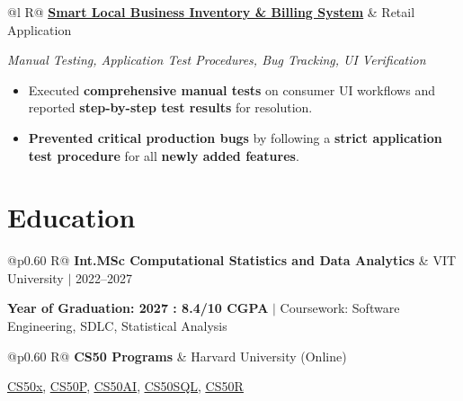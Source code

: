 \documentclass[a4paper,10pt]{article}
\newcommand{\ulink}[2]{\href{#1}{\uline{#2}}}
\newcommand{\subheading}[1]{{\color[HTML]{0A0A0A}\fontsize{12}{14}\selectfont\bfseries #1}}
\newcommand{\techstack}[1]{{\color[HTML]{5C5C5C}\fontsize{10.5}{12.5}\selectfont\itshape #1}}
\newcommand{\meta}[1]{{\color[HTML]{5C5C5C}\fontsize{10.5}{12.5}\selectfont #1}}
\begin{document}
\begin{tabularx}{\linewidth}{@{}l R@{}}
\subheading{\ulink{https://github.com/su-jin1425/Smart-Local-Business-Inventory-Billing-System}{Smart Local Business Inventory \& Billing System}} & \meta{Retail Application}
\end{tabularx}
\vspace{1pt}
\techstack{Manual Testing, Application Test Procedures, Bug Tracking, UI Verification}
\begin{itemize}[nosep, leftmargin=1.5em, itemsep=1pt, topsep=2pt]
  \item {\color[HTML]{0A0A0A}\fontsize{11}{14}\selectfont Executed \textbf{comprehensive manual tests} on consumer UI workflows and reported \textbf{step-by-step test results} for resolution.}
  \item {\color[HTML]{0A0A0A}\fontsize{11}{14}\selectfont \textbf{Prevented critical production bugs} by following a \textbf{strict application test procedure} for all \textbf{newly added features}.}
\end{itemize}

\vspace{1pt}

\section{Education}
\vspace{1pt}

\begin{tabularx}{\linewidth}{@{}p{0.60\linewidth} R@{}}
\subheading{Int.MSc Computational Statistics and Data Analytics} & \meta{VIT University $|$ 2022--2027}
\end{tabularx}
\vspace{1pt}
{\color[HTML]{3A3A3A}\fontsize{11}{14}\selectfont \textbf{Year of Graduation: 2027 : 8.4/10 CGPA} $|$ Coursework: Software Engineering, SDLC, Statistical Analysis}

\begin{tabularx}{\linewidth}{@{}p{0.60\linewidth} R@{}}
\subheading{CS50 Programs} & \meta{Harvard University (Online)}
\end{tabularx}
\vspace{1pt}
{\color[HTML]{3A3A3A}\fontsize{11}{14}\selectfont \ulink{https://cs50.harvard.edu/certificates/b14b78df-e05c-413e-a607-1dd27303053a}{CS50x}, \ulink{https://cs50.harvard.edu/certificates/32477052-9db4-49c4-a5a4-d7e58429ca2c}{CS50P}, \ulink{https://cs50.harvard.edu/certificates/9cdb4d4a-1250-4f8e-9fd7-191864e0f919}{CS50AI}, \ulink{https://cs50.harvard.edu/certificates/bc486f24-f085-4e61-8536-80940b97a1b9}{CS50SQL}, \ulink{https://cs50.harvard.edu/certificates/666838e6-a053-4d82-b179-a60fe745fd84}{CS50R}}
\end{document}
